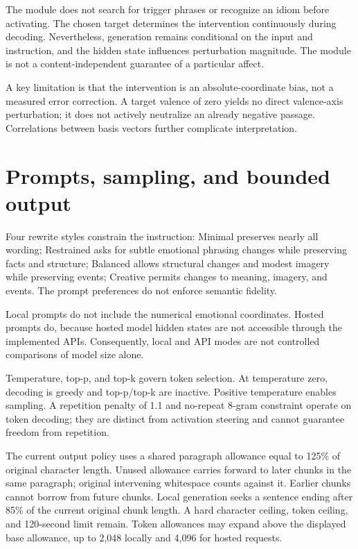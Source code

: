 \documentclass[manuscript,screen,nonacm]{acmart}
\begin{document}
The module does not search for trigger phrases or recognize an idiom
before activating. The chosen target determines the intervention
continuously during decoding. Nevertheless, generation remains
conditional on the input and instruction, and the hidden state
influences perturbation magnitude. The module is not a
content-independent guarantee of a particular affect.

A key limitation is that the intervention is an absolute-coordinate
bias, not a measured error correction. A target valence of zero yields
no direct valence-axis perturbation; it does not actively neutralize an
already negative passage. Correlations between basis vectors further
complicate interpretation.



\section{Prompts, sampling, and bounded
output}\label{prompts-sampling-and-bounded-output}

Four rewrite styles constrain the instruction: Minimal preserves nearly
all wording; Restrained asks for subtle emotional phrasing changes while
preserving facts and structure; Balanced allows structural changes and
modest imagery while preserving events; Creative permits changes to
meaning, imagery, and events. The prompt preferences do not enforce
semantic fidelity.

Local prompts do not include the numerical emotional coordinates. Hosted
prompts do, because hosted model hidden states are not accessible
through the implemented APIs. Consequently, local and API modes are not
controlled comparisons of model size alone.

Temperature, top-p, and top-k govern token selection. At temperature
zero, decoding is greedy and top-p/top-k are inactive. Positive
temperature enables sampling. A repetition penalty of 1.1 and no-repeat
8-gram constraint operate on token decoding; they are distinct from
activation steering and cannot guarantee freedom from repetition.

The current output policy uses a shared paragraph allowance equal to
125\% of original character length. Unused allowance carries forward to
later chunks in the same paragraph; original intervening whitespace
counts against it. Earlier chunks cannot borrow from future chunks.
Local generation seeks a sentence ending after 85\% of the current
original chunk length. A hard character ceiling, token ceiling, and
120-second limit remain. Token allowances may expand above the displayed
base allowance, up to 2,048 locally and 4,096 for hosted requests.
\end{document}
